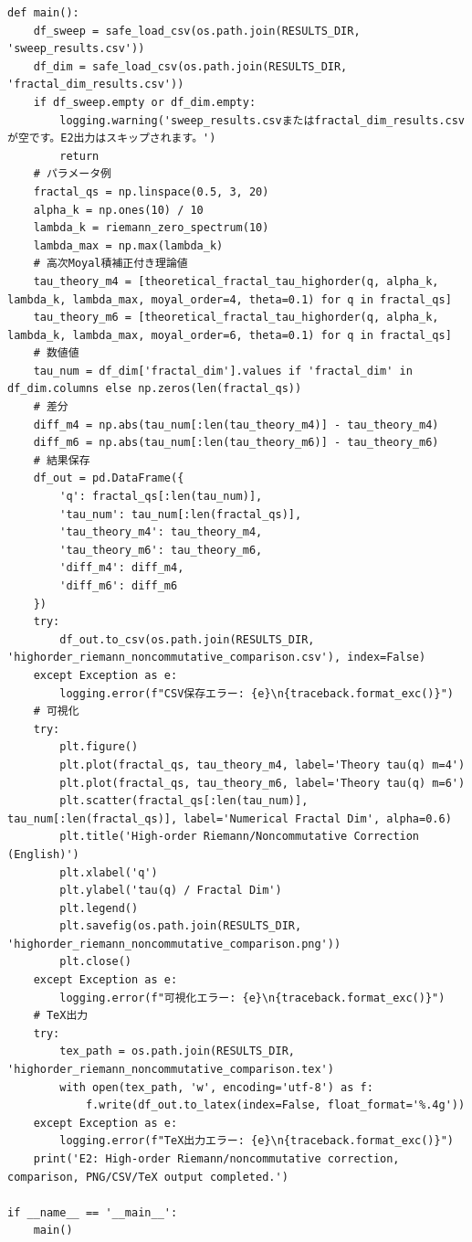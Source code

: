 \begin{verbatim}
def main():
    df_sweep = safe_load_csv(os.path.join(RESULTS_DIR, 'sweep_results.csv'))
    df_dim = safe_load_csv(os.path.join(RESULTS_DIR, 'fractal_dim_results.csv'))
    if df_sweep.empty or df_dim.empty:
        logging.warning('sweep_results.csvまたはfractal_dim_results.csvが空です。E2出力はスキップされます。')
        return
    # パラメータ例
    fractal_qs = np.linspace(0.5, 3, 20)
    alpha_k = np.ones(10) / 10
    lambda_k = riemann_zero_spectrum(10)
    lambda_max = np.max(lambda_k)
    # 高次Moyal積補正付き理論値
    tau_theory_m4 = [theoretical_fractal_tau_highorder(q, alpha_k, lambda_k, lambda_max, moyal_order=4, theta=0.1) for q in fractal_qs]
    tau_theory_m6 = [theoretical_fractal_tau_highorder(q, alpha_k, lambda_k, lambda_max, moyal_order=6, theta=0.1) for q in fractal_qs]
    # 数値値
    tau_num = df_dim['fractal_dim'].values if 'fractal_dim' in df_dim.columns else np.zeros(len(fractal_qs))
    # 差分
    diff_m4 = np.abs(tau_num[:len(tau_theory_m4)] - tau_theory_m4)
    diff_m6 = np.abs(tau_num[:len(tau_theory_m6)] - tau_theory_m6)
    # 結果保存
    df_out = pd.DataFrame({
        'q': fractal_qs[:len(tau_num)],
        'tau_num': tau_num[:len(fractal_qs)],
        'tau_theory_m4': tau_theory_m4,
        'tau_theory_m6': tau_theory_m6,
        'diff_m4': diff_m4,
        'diff_m6': diff_m6
    })
    try:
        df_out.to_csv(os.path.join(RESULTS_DIR, 'highorder_riemann_noncommutative_comparison.csv'), index=False)
    except Exception as e:
        logging.error(f"CSV保存エラー: {e}\n{traceback.format_exc()}")
    # 可視化
    try:
        plt.figure()
        plt.plot(fractal_qs, tau_theory_m4, label='Theory tau(q) m=4')
        plt.plot(fractal_qs, tau_theory_m6, label='Theory tau(q) m=6')
        plt.scatter(fractal_qs[:len(tau_num)], tau_num[:len(fractal_qs)], label='Numerical Fractal Dim', alpha=0.6)
        plt.title('High-order Riemann/Noncommutative Correction (English)')
        plt.xlabel('q')
        plt.ylabel('tau(q) / Fractal Dim')
        plt.legend()
        plt.savefig(os.path.join(RESULTS_DIR, 'highorder_riemann_noncommutative_comparison.png'))
        plt.close()
    except Exception as e:
        logging.error(f"可視化エラー: {e}\n{traceback.format_exc()}")
    # TeX出力
    try:
        tex_path = os.path.join(RESULTS_DIR, 'highorder_riemann_noncommutative_comparison.tex')
        with open(tex_path, 'w', encoding='utf-8') as f:
            f.write(df_out.to_latex(index=False, float_format='%.4g'))
    except Exception as e:
        logging.error(f"TeX出力エラー: {e}\n{traceback.format_exc()}")
    print('E2: High-order Riemann/noncommutative correction, comparison, PNG/CSV/TeX output completed.')

if __name__ == '__main__':
    main() \end{verbatim}

